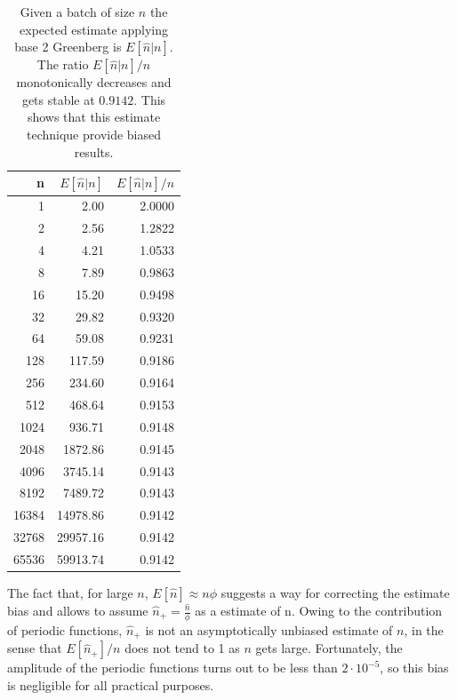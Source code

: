 \documentclass[11pt,a4paper,twoside,openright]{book}
\begin{document}
\begin{table}[H]
\caption[\emph{Basic Greenberg}: Expected Estimate]{Given a batch of size $n$ the expected estimate applying base 2 Greenberg is $E[\hat{n}|n]$. The ratio $E[\hat{n}|n]/n$ monotonically decreases and gets stable at $0.9142$. This shows that this estimate technique provide biased results.}
\begin{center}
\begin{tabular}{rD{.}{.}{5.2}D{.}{.}{1.4}}
\toprule
 n &  &  \\  &     2.00 &   2.0000 \\ 
2 &     2.56 &   1.2822 \\ 
4 &     4.21 &   1.0533 \\ 
8 &     7.89 &   0.9863 \\ 
16 &  15.20 &   0.9498 \\ 
32 &    29.82 &   0.9320 \\ 
64 &    59.08 &   0.9231 \\ 
128 &   117.59 &   0.9186 \\ 
256 &   234.60 &   0.9164 \\ 
512 &   468.64 &   0.9153 \\ 
1024 &   936.71 &   0.9148 \\ 
2048 &  1872.86 &   0.9145 \\ 
4096 &  3745.14 &   0.9143 \\ 
8192 &  7489.72 &   0.9143 \\ 
16384 & 14978.86 &   0.9142 \\ 
32768 & 29957.16 &   0.9142 \\ 
65536 & 59913.74 &   0.9142 \\\bottomrule
\end{tabular}
\end{center}
\label{table:phi-Phi}
\end{table}
The fact that, for large $n$, $E[\hat{n}] \approx n\phi$ suggests a way for correcting the estimate bias and allows to assume $\hat{n}_{+} = {\displaystyle\frac{\hat{n}}{\phi}}$ as a estimate of n. Owing to the contribution of periodic functions, $\hat{n}_{+}$ is not an asymptotically unbiased estimate of $n$, in the sense that  $E[\hat{n}_{+}]/n$ does not tend to 1 as $n$ gets large. Fortunately, the amplitude of the periodic functions turns out to be less than $2 \cdot10^{-5}$, so this bias is negligible for all practical purposes.\\
\end{document}
